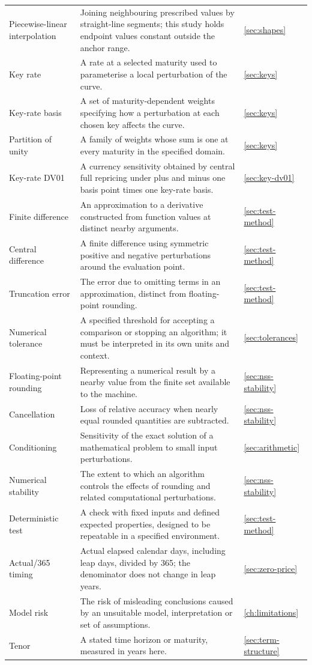 \begin{longtable}{@{}L{0.22\textwidth}L{0.58\textwidth}L{0.12\textwidth}@{}}
Piecewise-linear interpolation & Joining neighbouring prescribed values by straight-line segments; this study holds endpoint values constant outside the anchor range. & \ref{sec:shapes}\\
Key rate & A rate at a selected maturity used to parameterise a local perturbation of the curve. & \ref{sec:keys}\\
Key-rate basis & A set of maturity-dependent weights specifying how a perturbation at each chosen key affects the curve. & \ref{sec:keys}\\
Partition of unity & A family of weights whose sum is one at every maturity in the specified domain. & \ref{sec:keys}\\
Key-rate DV01 & A currency sensitivity obtained by central full repricing under plus and minus one basis point times one key-rate basis. & \ref{sec:key-dv01}\\
Finite difference & An approximation to a derivative constructed from function values at distinct nearby arguments. & \ref{sec:test-method}\\
Central difference & A finite difference using symmetric positive and negative perturbations around the evaluation point. & \ref{sec:test-method}\\
Truncation error & The error due to omitting terms in an approximation, distinct from floating-point rounding. & \ref{sec:test-method}\\
Numerical tolerance & A specified threshold for accepting a comparison or stopping an algorithm; it must be interpreted in its own units and context. & \ref{sec:tolerances}\\
Floating-point rounding & Representing a numerical result by a nearby value from the finite set available to the machine. & \ref{sec:nss-stability}\\
Cancellation & Loss of relative accuracy when nearly equal rounded quantities are subtracted. & \ref{sec:nss-stability}\\
Conditioning & Sensitivity of the exact solution of a mathematical problem to small input perturbations. & \ref{sec:arithmetic}\\
Numerical stability & The extent to which an algorithm controls the effects of rounding and related computational perturbations. & \ref{sec:nss-stability}\\
Deterministic test & A check with fixed inputs and defined expected properties, designed to be repeatable in a specified environment. & \ref{sec:test-method}\\
Actual/365 timing & Actual elapsed calendar days, including leap days, divided by 365; the denominator does not change in leap years. & \ref{sec:zero-price}\\
Model risk & The risk of misleading conclusions caused by an unsuitable model, interpretation or set of assumptions. & \ref{ch:limitations}\\
Tenor & A stated time horizon or maturity, measured in years here. & \ref{sec:term-structure}\\
\end{longtable}
\endgroup
